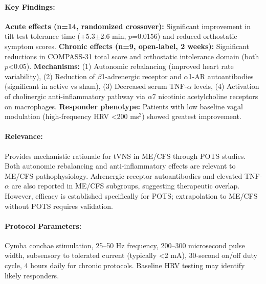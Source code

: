 \paragraph{Key Findings:}
\textbf{Acute effects (n=14, randomized crossover):} Significant improvement in tilt test tolerance time (+5.3$\pm$2.6 min, $p$=0.0156) and reduced orthostatic symptom scores. \textbf{Chronic effects (n=9, open-label, 2 weeks):} Significant reductions in COMPASS-31 total score and orthostatic intolerance domain (both $p$<0.05). \textbf{Mechanisms:} (1) Autonomic rebalancing (improved heart rate variability), (2) Reduction of $\beta$1-adrenergic receptor and $\alpha$1-AR autoantibodies (significant in active vs sham), (3) Decreased serum TNF-$\alpha$ levels, (4) Activation of cholinergic anti-inflammatory pathway via $\alpha$7 nicotinic acetylcholine receptors on macrophages. \textbf{Responder phenotype:} Patients with low baseline vagal modulation (high-frequency HRV <200 ms$^2$) showed greatest improvement.

\paragraph{Relevance:}
Provides mechanistic rationale for tVNS in ME/CFS through POTS studies. Both autonomic rebalancing and anti-inflammatory effects are relevant to ME/CFS pathophysiology. Adrenergic receptor autoantibodies and elevated TNF-$\alpha$ are also reported in ME/CFS subgroups, suggesting therapeutic overlap. However, efficacy is established specifically for POTS; extrapolation to ME/CFS without POTS requires validation.

\paragraph{Protocol Parameters:}
Cymba conchae stimulation, 25--50 Hz frequency, 200--300 microsecond pulse width, subsensory to tolerated current (typically <2 mA), 30-second on/off duty cycle, 4 hours daily for chronic protocols. Baseline HRV testing may identify likely responders.

